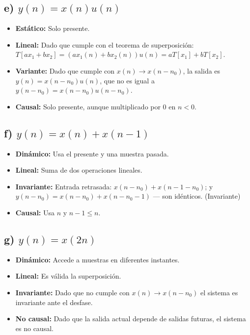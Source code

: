 \documentclass[12pt,a4paper]{article}
\begin{document}
\subsection*{e) $y(n) = x(n)u(n)$}

\begin{itemize}
\item \textbf{Estático:} Solo presente.
\item \textbf{Lineal:} Dado que cumple con el teorema de superposición: $T[ax_1 + bx_2] = (ax_1(n) + bx_2(n))u(n) = aT[x_1] + bT[x_2]$.
\item \textbf{Variante:} Dado que cumple con $x(n) \to x(n-n_0)$, la salida es $y(n) = x(n-n_0)u(n)$, que no es igual a $y(n-n_0) = x(n-n_0)u(n-n_0)$.
\item \textbf{Causal:} Solo presente, aunque multiplicado por 0 en $n < 0$.
\end{itemize}

\subsection*{f) $y(n) = x(n) + x(n-1)$}

\begin{itemize}
\item \textbf{Dinámico:} Usa el presente y una muestra pasada.
\item \textbf{Lineal:} Suma de dos operaciones lineales.
\item \textbf{Invariante:} Entrada retrasada: $x(n-n_0) + x(n-1-n_0)$; y $y(n-n_0) = x(n-n_0) + x(n-n_0-1)$ — son idénticos. (Invariante)
\item \textbf{Causal:} Usa $n$ y $n-1 \leq n$.
\end{itemize}

\subsection*{g) $y(n) = x(2n)$}

\begin{itemize}
\item \textbf{Dinámico:} Accede a muestras en diferentes instantes.
\item \textbf{Lineal:} Es válida la superposición.
\item \textbf{Invariante:} Dado que no cumple con $x(n) \to x(n-n_0)$ el sistema es invariante ante el desfase.
\item \textbf{No causal:} Dado que la salida actual depende de salidas futuras, el sistema es no causal.
\end{itemize}
\end{document}
